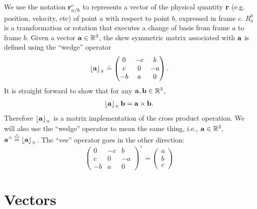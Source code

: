 We use the notation $\mathbf{r}_{a/b}^{c}$ to represents a vector of the physical quantity $\mathbf{r}$ (e.g. position, velocity, etc) of point $a$ with respect to point $b$, expressed in frame $c$.  $R_{a}^{b}$ is a transformation or rotation that executes a change of basis from frame $a$ to frame $b$. 
Given a vector $\mathbf{a}\in\mathbb{R}^3$, the skew symmetric matrix associated with $\mathbf{a}$ is defined using the ``wedge'' operator
\begin{equation}\label{eq:wedge}
\ss{\abf} \doteq \begin{pmatrix} 0 & -c & b \\ c & 0 & -a \\ -b & a & 0 \end{pmatrix}.
\end{equation}
It is straight forward to show that for any $\mathbf{a},\mathbf{b}\in\mathbb{R}^3$, 
\[
\left\lfloor\mathbf{a}\right\rfloor_{\times} \mathbf{b} = \mathbf{a}\times\mathbf{b}.
\]
Therefore $\left\lfloor\mathbf{a}\right\rfloor_{\times}$ is a matrix implementation of the cross product operation.  We will also use the ``wedge'' operator to mean the same thing, i.e., $\mathbf{a}\in\mathbb{R}^3$, $\mathbf{a}^{\wedge} \stackrel{\triangle}{=} \left\lfloor\mathbf{a}\right\rfloor_{\times}$.
The ``vee'' operator goes in the other direction:
\begin{equation}\label{eq:vee_so_3}
\begin{pmatrix} 0 & -c & b \\ c & 0 & -a \\ -b & a & 0 \end{pmatrix}^\vee = \begin{pmatrix} a \\ b \\ c \end{pmatrix}
\end{equation}

\section{Vectors}

